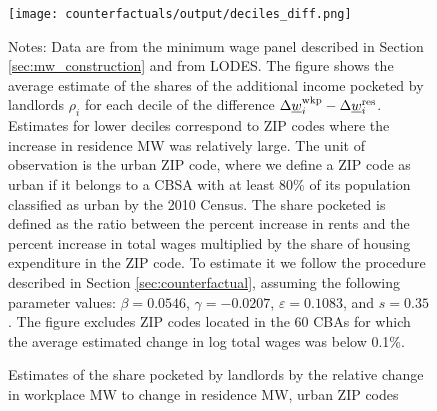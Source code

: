 \begin{figure}[h!]
    \centering
    \caption{Estimates of the share pocketed by landlords by the relative 
             change in workplace MW to change in residence MW, urban ZIP codes}
    \label{fig:rho_by_decile_MW_gap}

	\texttt{[image: counterfactuals/output/deciles\_diff.png]}

    \begin{minipage}{.95\textwidth} \footnotesize
        \vspace{3mm}
        Notes:
        Data are from the minimum wage panel described in 
        Section \ref{sec:mw_construction} and from LODES.
        The figure shows the average estimate of the shares of the additional 
        income pocketed by landlords $\rho_i$ for each decile of the 
        difference $\Delta \underline{w}_i^{\text{wkp}} - \Delta \underline{w}_i^{\text{res}}$.
        Estimates for lower deciles correspond to ZIP codes where the increase 
        in residence MW was relatively large.
        The unit of observation is the urban ZIP code, where we define a ZIP code 
        as urban if it belongs to a CBSA with at least 80\% of its population 
        classified as urban by the 2010 Census.
        The share pocketed is defined as the ratio between the percent increase 
        in rents and the percent increase in total wages multiplied by the share 
        of housing expenditure in the ZIP code.
        To estimate it we follow the procedure described in Section 
        \ref{sec:counterfactual}, assuming the following parameter values: 
        $\beta = 0.0546$, $\gamma = -0.0207$, $\varepsilon = 0.1083$, and 
        $s = 0.35$.
        The figure excludes ZIP codes located in the 60 CBAs for which the average
        estimated change in log total wages was below 0.1\%.
    \end{minipage}
\end{figure}
